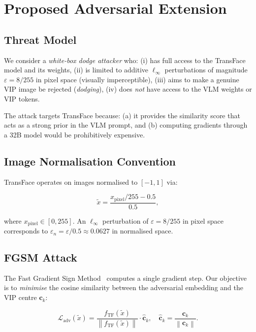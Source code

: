 \documentclass[12pt,a4paper]{article}
\newcommand{\norm}[1]{\left\lVert#1\right\rVert}
\begin{document}
\section{Proposed Adversarial Extension}

\subsection{Threat Model}

We consider a \emph{white-box dodge attacker} who:
(i) has full access to the TransFace model and its weights,
(ii) is limited to additive $\ell_\infty$ perturbations of magnitude
     $\varepsilon = 8/255$ in pixel space (visually imperceptible),
(iii) aims to make a genuine VIP image be rejected (\emph{dodging}),
(iv) does \emph{not} have access to the VLM weights or VIP tokens.

The attack targets TransFace because: (a) it provides the similarity score that
acts as a strong prior in the VLM prompt, and (b) computing gradients through a
32B model would be prohibitively expensive.

\subsection{Image Normalisation Convention}

TransFace operates on images normalised to $[-1, 1]$ via:

\begin{equation}
  \tilde{x} = \frac{x_{\text{pixel}} / 255 - 0.5}{0.5},
\end{equation}

where $x_{\text{pixel}} \in [0, 255]$.  An $\ell_\infty$ perturbation of
$\varepsilon = 8/255$ in pixel space corresponds to
$\varepsilon_n = \varepsilon / 0.5 \approx 0.0627$ in normalised space.

\subsection{FGSM Attack}
\label{sec:fgsm}

The Fast Gradient Sign Method~\cite{goodfellow2014explaining} computes a
single gradient step.  Our objective is to \emph{minimise} the cosine similarity
between the adversarial embedding and the VIP centre $\mathbf{c}_k$:

\begin{equation}
  \mathcal{L}_{\text{adv}}(\tilde{x}) =
  \frac{f_{\text{TF}}(\tilde{x})}{\norm{f_{\text{TF}}(\tilde{x})}}
  \cdot \hat{\mathbf{c}}_k,
  \quad
  \hat{\mathbf{c}}_k = \frac{\mathbf{c}_k}{\norm{\mathbf{c}_k}}.
  \label{eq:advloss}
\end{equation}
\end{document}
